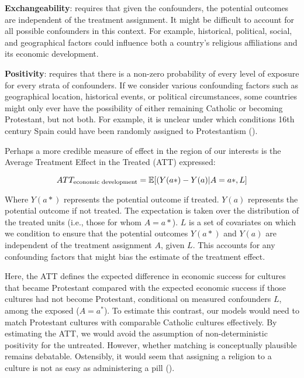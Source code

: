 \documentclass[
  singlecolumn]{article}
\begin{document}
\textbf{Exchangeability}: requires that given the confounders, the
potential outcomes are independent of the treatment assignment. It might
be difficult to account for all possible confounders in this context.
For example, historical, political, social, and geographical factors
could influence both a country's religious affiliations and its economic
development.

\textbf{Positivity}: requires that there is a non-zero probability of
every level of exposure for every strata of confounders. If we consider
various confounding factors such as geographical location, historical
events, or political circumstances, some countries might only ever have
the possibility of either remaining Catholic or becoming Protestant, but
not both. For example, it is unclear under which conditions 16th century
Spain could have been randomly assigned to Protestantism
().

Perhaps a more credible measure of effect in the region of our interests
is the Average Treatment Effect in the Treated (ATT) expressed:

\[ATT_{\textnormal{economic~development}} = \mathbb{E}[(Y(a*)- Y(a)|A = a*,L]\]

Where \(Y(a*)\) represents the potential outcome if treated. \(Y(a)\)
represents the potential outcome if not treated. The expectation is
taken over the distribution of the treated units (i.e., those for whom
\(A = a*\)). \(L\) is a set of covariates on which we condition to
ensure that the potential outcomes \(Y(a*)\) and \(Y(a)\) are
independent of the treatment assignment \(A\), given \(L\). This
accounts for any confounding factors that might bias the estimate of the
treatment effect.

Here, the ATT defines the expected difference in economic success for
cultures that became Protestant compared with the expected economic
success if those cultures had not become Protestant, conditional on
measured confounders \(L\), among the exposed (\(A = a^*\)). To estimate
this contrast, our models would need to match Protestant cultures with
comparable Catholic cultures effectively. By estimating the ATT, we
would avoid the assumption of non-deterministic positivity for the
untreated. However, whether matching is conceptually plausible remains
debatable. Ostensibly, it would seem that assigning a religion to a
culture is not as easy as administering a pill
().

\newpage{}
\end{document}
